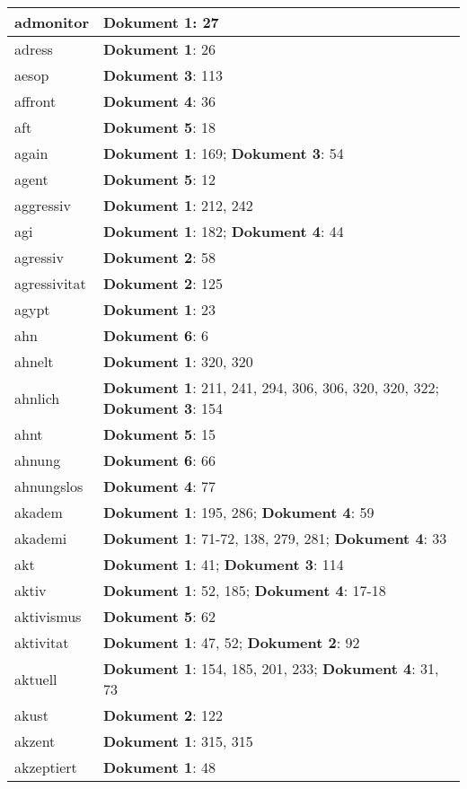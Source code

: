 \documentclass[a5paper]{article}
\begin{document}
\begin{longtable}[l]{|l|p{3in}|}
\hline
admonitor & \textbf{Dokument 1}: 27 \\
\hline
adress & \textbf{Dokument 1}: 26 \\
\hline
aesop & \textbf{Dokument 3}: 113 \\
\hline
affront & \textbf{Dokument 4}: 36 \\
\hline
aft & \textbf{Dokument 5}: 18 \\
\hline
again & \textbf{Dokument 1}: 169; \textbf{Dokument 3}: 54 \\
\hline
agent & \textbf{Dokument 5}: 12 \\
\hline
aggressiv & \textbf{Dokument 1}: 212, 242 \\
\hline
agi & \textbf{Dokument 1}: 182; \textbf{Dokument 4}: 44 \\
\hline
agressiv & \textbf{Dokument 2}: 58 \\
\hline
agressivitat & \textbf{Dokument 2}: 125 \\
\hline
agypt & \textbf{Dokument 1}: 23 \\
\hline
ahn & \textbf{Dokument 6}: 6 \\
\hline
ahnelt & \textbf{Dokument 1}: 320, 320 \\
\hline
ahnlich & \textbf{Dokument 1}: 211, 241, 294, 306, 306, 320, 320, 322; \textbf{Dokument 3}: 154 \\
\hline
ahnt & \textbf{Dokument 5}: 15 \\
\hline
ahnung & \textbf{Dokument 6}: 66 \\
\hline
ahnungslos & \textbf{Dokument 4}: 77 \\
\hline
akadem & \textbf{Dokument 1}: 195, 286; \textbf{Dokument 4}: 59 \\
\hline
akademi & \textbf{Dokument 1}: 71-72, 138, 279, 281; \textbf{Dokument 4}: 33 \\
\hline
akt & \textbf{Dokument 1}: 41; \textbf{Dokument 3}: 114 \\
\hline
aktiv & \textbf{Dokument 1}: 52, 185; \textbf{Dokument 4}: 17-18 \\
\hline
aktivismus & \textbf{Dokument 5}: 62 \\
\hline
aktivitat & \textbf{Dokument 1}: 47, 52; \textbf{Dokument 2}: 92 \\
\hline
aktuell & \textbf{Dokument 1}: 154, 185, 201, 233; \textbf{Dokument 4}: 31, 73 \\
\hline
akust & \textbf{Dokument 2}: 122 \\
\hline
akzent & \textbf{Dokument 1}: 315, 315 \\
\hline
akzeptiert & \textbf{Dokument 1}: 48 \\

\end{longtable}
\end{document}
